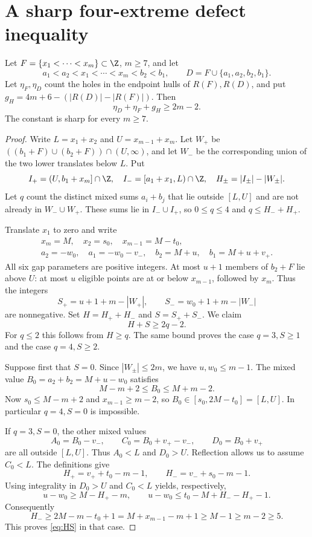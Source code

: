 \section{A sharp four-extreme defect inequality}\label{sec:sharp}
\begin{theorem}\label{thm:sharp}
Let $F=\{x_1<\cdots<x_m\}\subset\Z$, $m\ge7$, and let
\[
 a_1<a_2<x_1<\cdots<x_m<b_2<b_1,\qquad
 D=F\cup\{a_1,a_2,b_2,b_1\}.
\]
Let $\eta_F,\eta_D$ count the holes in the endpoint hulls of $R(F),R(D)$,
and put $g_H=4m+6-(|R(D)|-|R(F)|)$. Then
\begin{equation}\label{eq:sharp}
 \boxed{\eta_D+\eta_F+g_H\ge2m-2.}
\end{equation}
The constant is sharp for every $m\ge7$.
\end{theorem}
\begin{proof}
Write $L=x_1+x_2$ and $U=x_{m-1}+x_m$. Let $W_+$ be
$((b_1+F)\cup(b_2+F))\cap(U,\infty)$, and let $W_-$ be the corresponding
union of the two lower translates below $L$. Put
\[
 I_+=(U,b_1+x_m]\cap\Z,\quad I_-=[a_1+x_1,L)\cap\Z,
 \quad H_\pm=|I_\pm|-|W_\pm|.
\]
Let $q$ count the distinct mixed sums $a_i+b_j$ that lie outside $[L,U]$
and are not already in $W_-\cup W_+$. These sums lie in $I_-\cup I_+$,
so $0\le q\le4$ and $q\le H_-+H_+$.

Translate $x_1$ to zero and write
\[
\begin{gathered}
 x_m=M,\quad x_2=s_0,\quad x_{m-1}=M-t_0,\\
 a_2=-w_0,\quad a_1=-w_0-v_-,\quad
 b_2=M+u,\quad b_1=M+u+v_+.
\end{gathered}
\]
All six gap parameters are positive integers. At most $u+1$ members of
$b_2+F$ lie above $U$: at most $u$ eligible points are at or below
$x_{m-1}$, followed by $x_m$. Thus the integers
\[
 S_+=u+1+m-|W_+|,\qquad S_-=w_0+1+m-|W_-|
\]
are nonnegative. Set $H=H_++H_-$ and $S=S_++S_-$. We claim
\begin{equation}\label{eq:HS}
 H+S\ge2q-2.
\end{equation}
For $q\le2$ this follows from $H\ge q$. The same bound proves the case
$q=3,S\ge1$ and the case $q=4,S\ge2$.

Suppose first that $S=0$. Since $|W_\pm|\le2m$, we have
$u,w_0\le m-1$. The mixed value $B_0=a_2+b_2=M+u-w_0$ satisfies
\[
 M-m+2\le B_0\le M+m-2.
\]
Now $s_0\le M-m+2$ and $x_{m-1}\ge m-2$, so
$B_0\in[s_0,2M-t_0]=[L,U]$. In particular $q=4,S=0$ is impossible.

If $q=3,S=0$, the other mixed values
\[
 A_0=B_0-v_-,\qquad C_0=B_0+v_+-v_-,\qquad D_0=B_0+v_+
\]
are all outside $[L,U]$. Thus $A_0<L$ and $D_0>U$. Reflection allows us to
assume $C_0<L$. The definitions give
\[
 H_+=v_++t_0-m-1,\qquad H_-=v_-+s_0-m-1.
\]
Using integrality in $D_0>U$ and $C_0<L$ yields, respectively,
\[
 u-w_0\ge M-H_+-m,\qquad
 u-w_0\le t_0-M+H_--H_+-1.
\]
Consequently
\[
 H_-\ge2M-m-t_0+1=M+x_{m-1}-m+1\ge M-1\ge m-2\ge5.
\]
This proves \eqref{eq:HS} in that case.


\end{proof}
